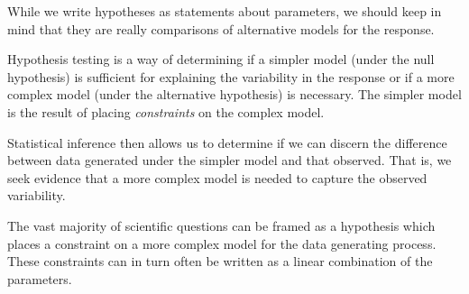 \documentclass[
  letterpaper,
  DIV=11,
  numbers=noendperiod]{scrreprt}
\theoremstyle{definition}
\theoremstyle{definition}
\theoremstyle{remark}
\begin{document}
While we write hypotheses as statements about parameters, we should keep
in mind that they are really comparisons of alternative models for the
response.

\begin{tcolorbox}[enhanced jigsaw, bottomrule=.15mm, titlerule=0mm, bottomtitle=1mm, colback=white, coltitle=black, rightrule=.15mm, leftrule=.75mm, toprule=.15mm, toptitle=1mm, left=2mm, opacityback=0, colframe=quarto-callout-tip-color-frame, breakable, title=\textcolor{quarto-callout-tip-color}{\faLightbulb}\hspace{0.5em}{Big Idea}, arc=.35mm, colbacktitle=quarto-callout-tip-color!10!white, opacitybacktitle=0.6]

Hypothesis testing is a way of determining if a simpler model (under the
null hypothesis) is sufficient for explaining the variability in the
response or if a more complex model (under the alternative hypothesis)
is necessary. The simpler model is the result of placing
\emph{constraints} on the complex model.

Statistical inference then allows us to determine if we can discern the
difference between data generated under the simpler model and that
observed. That is, we seek evidence that a more complex model is needed
to capture the observed variability.

\end{tcolorbox}

The vast majority of scientific questions can be framed as a hypothesis
which places a constraint on a more complex model for the data
generating process. These constraints can in turn often be written as a
linear combination of the parameters.
\end{document}

